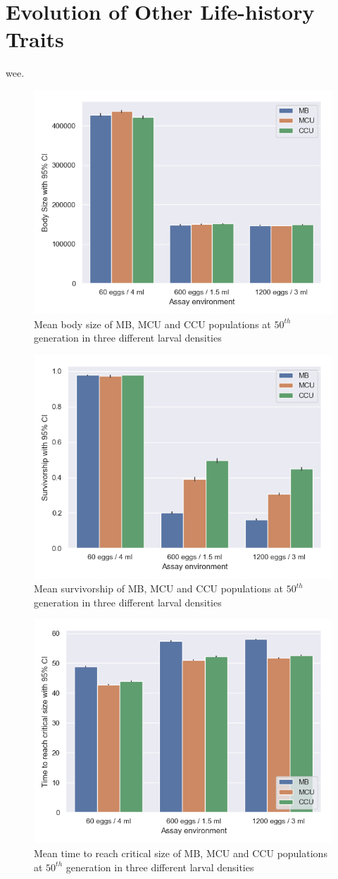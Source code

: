 \section{Evolution of Other Life-history Traits}
wee.
\begin{figure}[p]
  \centering
  \includegraphics[width=.75\textwidth]{C4/Figs/larval_alive_sizec4}
  \caption{Mean body size of MB, MCU and CCU populations at $50^{th}$ generation in three different larval densities}
  \label{fig:lh-bs}
\end{figure}
\begin{figure}[p]
  \centering
  \includegraphics[width=.75\textwidth]{C4/Figs/larval_survc4}
  \caption{Mean survivorship of MB, MCU and CCU populations at $50^{th}$ generation in three different larval densities}
  \label{fig:lh-sur}
\end{figure}
\begin{figure}[p]
  \centering
  \includegraphics[width=.75\textwidth]{C4/Figs/larval_alive_devtc4}
  \caption{Mean time to reach critical size of MB, MCU and CCU populations at $50^{th}$ generation in three different larval densities}
  \label{fig:lh-dt}
\end{figure}
\pagebreak
